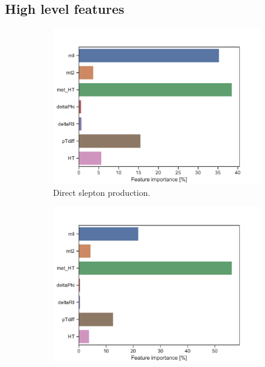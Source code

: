 \subsection{High level features}

\begin{figure}[H]
    \centering
    \begin{subfigure}[t!]{0.49\textwidth}
        \includegraphics[width = \textwidth]{Figures/SlepSlep/ML/BDT/High_level/Low/featureImportance.pdf}
        \caption{Direct slepton production.}
        \label{fig:featSlepslepLow}
    \end{subfigure}
    \begin{subfigure}[t!]{0.49\textwidth}
        \includegraphics[width = \textwidth]{Figures/SlepSnu/BDT/High_level/Low/featureImportance.pdf}

\end{subfigure}
\end{figure}
